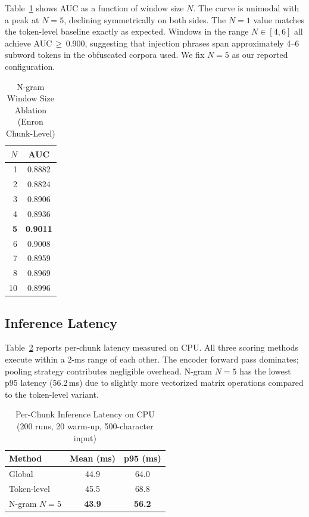 \documentclass[conference]{IEEEtran}
\begin{document}
Table~\ref{tab:ablation} shows AUC as a function of window size \(N\). The curve is
unimodal with a peak at \(N=5\), declining symmetrically on both sides. The \(N=1\)
value matches the token-level baseline exactly as expected. Windows in the range
\(N \in [4, 6]\) all achieve AUC\,\(\geq\)\,0.900, suggesting that injection phrases
span approximately 4--6 subword tokens in the obfuscated corpora used. We fix
\(N=5\) as our reported configuration.

\begin{table}[t]
\caption{N-gram Window Size Ablation (Enron Chunk-Level)}
\label{tab:ablation}
\centering
\begin{tabular}{rc}
\toprule
\(N\) & AUC \\
\midrule
1 & 0.8882 \\
2 & 0.8824 \\
3 & 0.8906 \\
4 & 0.8936 \\
\textbf{5} & \textbf{0.9011} \\
6 & 0.9008 \\
7 & 0.8959 \\
8 & 0.8969 \\
10 & 0.8996 \\
\bottomrule
\end{tabular}
\end{table}

\subsection{Inference Latency}
\label{ssec:latency}

Table~\ref{tab:latency} reports per-chunk latency measured on CPU. All three scoring
methods execute within a 2-ms range of each other. The encoder forward pass
dominates; pooling strategy contributes negligible overhead. N-gram \(N=5\) has
the lowest p95 latency (56.2\,ms) due to slightly more vectorized matrix operations
compared to the token-level variant.

\begin{table}[t]
\caption{Per-Chunk Inference Latency on CPU\\
(200 runs, 20 warm-up, 500-character input)}
\label{tab:latency}
\centering
\begin{tabular}{lcc}
\toprule
Method & Mean (ms) & p95 (ms) \\
\midrule
Global & 44.9 & 64.0 \\
Token-level & 45.5 & 68.8 \\
N-gram \(N=5\) & \textbf{43.9} & \textbf{56.2} \\
\bottomrule
\end{tabular}
\end{table}
\end{document}

